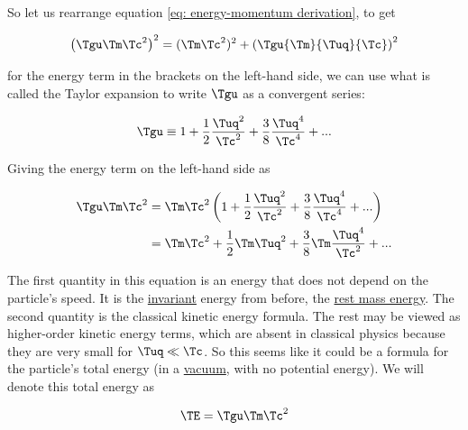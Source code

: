 \begin{derivation}

	So let us rearrange equation \eqref{eq: energy-momentum derivation}, to get

	\begin{equation}
		\label{eq: total relativistic energy}
		\left( \Tgu  \Tm  \Tc ^2 \right)^2 = (\Tm  \Tc ^2)^2 + \left( \Tgu  {\Tm }{\Tuq }{\Tc }\right)^2
	\end{equation}

	for the energy term in the brackets on the left-hand side, we can use what is called the Taylor expansion to write $\Tgu $ as a convergent series:

	\begin{equation}
		\Tgu  \equiv 1 + \frac{1}{2}\frac{\Tuq ^2}{ \Tc ^2} + \frac{3}{8}\frac{\Tuq ^4}{\Tc ^4} + ...
	\end{equation}

	Giving the energy term on the left-hand side as

	\begin{equation}
		\begin{aligned}
			\Tgu  \Tm  \Tc ^2 & = \Tm  \Tc ^2  \left(1 + \frac{1}{2}\frac{\Tuq ^2}{ \Tc ^2} + \frac{3}{8}\frac{\Tuq ^4}{\Tc ^4} + ...
			\right)                                                                                                         \\
			                    & = \Tm  \Tc ^2 + \frac{1}{2} \Tm  \Tuq ^2 + \frac{3}{8} \Tm  \frac{\Tuq ^4}{ \Tc ^2} + ...
		\end{aligned}
	\end{equation}

	The first quantity in this equation is an energy that does not depend on the particle's speed.
	It is the \hyperlink{def-lorentz-invariant}{invariant} energy from before, the \hyperlink{def-rest-mass-energy}{rest mass energy}.
	The second quantity is the classical kinetic energy formula.
	The rest may be viewed as higher-order kinetic energy terms, which are absent in classical physics because they are very small for ${\Tuq } \ll {\Tc }$.
	So this seems like it could be a formula for the particle's total energy (in a \hyperlink{def-vacuum}{vacuum}, with no potential energy).
	We will denote this total energy as

	\begin{equation}
		\label{eq: Total Energy Compact Version}
		{\TE } = \Tgu  \Tm  \Tc ^2
	\end{equation}


\end{derivation}
